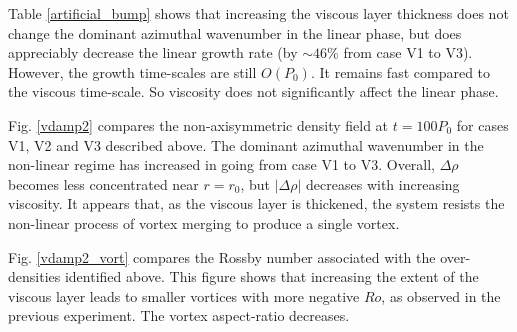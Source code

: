 Table \ref{artificial_bump} shows that increasing the viscous layer thickness does not
change the dominant azimuthal wavenumber in the linear phase, but does appreciably decrease the 
linear growth rate (by $\sim 46\%$ from case V1 to V3). However, the growth time-scales are still
$O(P_0)$.  It remains fast compared to the viscous time-scale. So
viscosity does not significantly affect the linear phase.  

Fig. \ref{vdamp2} compares the non-axisymmetric density field at
$t=100P_0$ for cases V1, V2 and V3 described above. 
The dominant azimuthal wavenumber in the non-linear regime has increased in going from case
V1 to V3. Overall, $\Delta\rho$ becomes less concentrated near $r=r_0$, but $|\Delta\rho|$
decreases with increasing viscosity. It appears that, as the viscous layer is thickened,  
the system resists the non-linear process of vortex merging to produce a single vortex. 

Fig. \ref{vdamp2_vort} compares the Rossby number associated with the
over-densities identified above. This figure shows
that increasing the extent of the viscous layer leads to smaller 
vortices with more negative $Ro$, as observed in the previous experiment. The vortex aspect-ratio 
decreases.   


